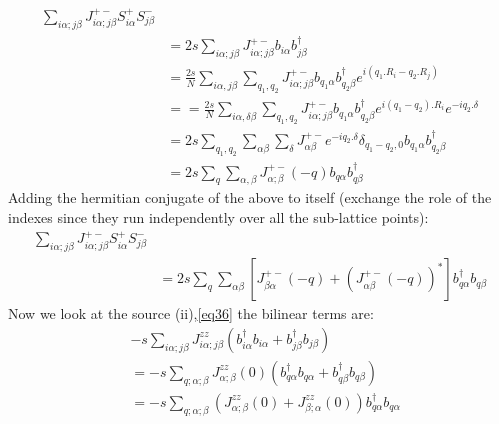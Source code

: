 \begin{equation}\label{eq42}
\begin{split}
\sum_{i\alpha;j\beta}^{}J^{+-}_{i\alpha;j\beta}S^+_{i\alpha}S^-_{j\beta}&\\
&=2s\sum_{i\alpha;j\beta}^{}J^{+-}_{i\alpha;j\beta}b_{i\alpha}b^\dagger_{j\beta}\\
&=\frac{2s}{N}\sum_{i\alpha,j\beta}^{}\sum_{q_1,q_2}^{}J^{+-}_{i\alpha;j\beta}b_{q_1\alpha}b^\dagger_{q_2\beta}e^{i(q_1.R_i - q_2.R_j)}\\
& = =\frac{2s}{N}\sum_{i\alpha,\delta \beta}^{}\sum_{q_1,q_2}^{}J^{+-}_{i\alpha;j\beta}b_{q_1\alpha}b^\dagger_{q_2\beta}e^{i(q_1 - q_2).R_i}e^{-iq_2.\delta}\\
& = 2s\sum_{q_1,q_2}^{}\sum_{\alpha \beta}^{}\sum_{\delta}^{}J^{+-}_{\alpha \beta}e^{-iq_2.\delta}\delta_{q_1-q_2,0}b_{q_1\alpha}b^\dagger_{q_2\beta}\\
&=2s\sum_{q}^{}\sum_{\alpha,\beta}^{}J^{+-}_{\alpha;\beta}(-q)b_{q\alpha}b^\dagger_{q\beta}
\end{split}
\end{equation}
Adding the hermitian conjugate of the above to itself (exchange the role of the indexes since they run independently over all the sub-lattice points):
\begin{equation}\label{eq43}
\begin{split}
\sum_{i\alpha;j\beta}^{}J^{+-}_{i\alpha;j\beta}S^+_{i\alpha}S^-_{j\beta}&\\
&=2s\sum_{q}^{}\sum_{\alpha \beta}^{}[J^{+-}_{\beta \alpha}(-q) + (J^{+-}_{\alpha \beta}(-q))^*]b_{q\alpha}^\dagger b_{q\beta}
\end{split}
\end{equation}
Now we look at the source (ii),\ref{eq36} the bilinear terms are:
\begin{equation}\label{44}
\begin{split}
&-s\sum_{i\alpha;j\beta}^{}J^{zz}_{i\alpha;j\beta}(b^\dagger_{i\alpha}b_{i\alpha} + b^\dagger_{j\beta}b_{j\beta})\\
&=-s\sum_{q;\alpha;\beta}^{}J^{zz}_{\alpha;\beta}(0)(b^\dagger_{q\alpha}b_{q\alpha} + b^\dagger_{q\beta}b_{q\beta})\\
&=-s\sum_{q;\alpha;\beta}^{}(J^{zz}_{\alpha;\beta}(0) + J^{zz}_{\beta;\alpha}(0))b^\dagger_{q\alpha}b_{q\alpha}
\end{split}
\end{equation}

